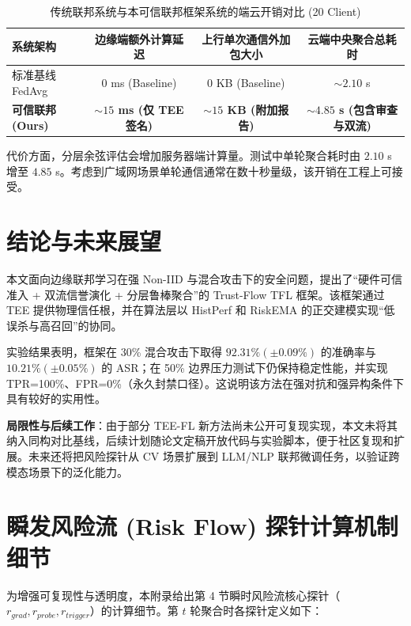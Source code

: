 \documentclass[11pt, a4paper, UTF8, fontset=fandol]{ctexart}
\begin{document}
\begin{table}[htbp]
\centering
\caption{传统联邦系统与本可信联邦框架系统的端云开销对比 (20 Client)}
\vspace{4pt}
\label{tab:overhead}
\begin{tabular}{l c c c}
\toprule
\textbf{系统架构} & \textbf{边缘端额外计算延迟} & \textbf{上行单次通信外加包大小} & \textbf{云端中央聚合总耗时} \\
\midrule
标准基线 FedAvg & 0 ms (Baseline) & 0 KB (Baseline) & $\sim 2.10$ s \\
\textbf{可信联邦 (Ours)} & \textbf{$\sim 15$ ms (仅 TEE 签名)} & \textbf{$\sim 15$ KB (附加报告)} & \textbf{$\sim 4.85$ s (包含审查与双流)} \\
\bottomrule
\end{tabular}
\end{table}

代价方面，分层余弦评估会增加服务器端计算量。测试中单轮聚合耗时由 $2.10$ s 增至 $4.85$ s。考虑到广域网场景单轮通信通常在数十秒量级，该开销在工程上可接受。

\section{结论与未来展望}
本文面向边缘联邦学习在强 Non-IID 与混合攻击下的安全问题，提出了“硬件可信准入 + 双流信誉演化 + 分层鲁棒聚合”的 Trust-Flow TFL 框架。该框架通过 TEE 提供物理信任根，并在算法层以 HistPerf 和 RiskEMA 的正交建模实现“低误杀与高召回”的协同。

实验结果表明，框架在 30\% 混合攻击下取得 $92.31\% (\pm 0.09\%)$ 的准确率与 $10.21\% (\pm 0.05\%)$ 的 ASR；在 50\% 边界压力测试下仍保持稳定性能，并实现 TPR=100\%、FPR=0\%（永久封禁口径）。这说明该方法在强对抗和强异构条件下具有较好的实用性。

\textbf{局限性与后续工作}：由于部分 TEE-FL 新方法尚未公开可复现实现，本文未将其纳入同构对比基线，后续计划随论文定稿开放代码与实验脚本，便于社区复现和扩展。未来还将把风险探针从 CV 场景扩展到 LLM/NLP 联邦微调任务，以验证跨模态场景下的泛化能力。

\appendix
\section{瞬发风险流 (Risk Flow) 探针计算机制细节}
为增强可复现性与透明度，本附录给出第 4 节瞬时风险流核心探针（$r_{grad}, r_{probe}, r_{trigger}$）的计算细节。第 $t$ 轮聚合时各探针定义如下：
\end{document}
